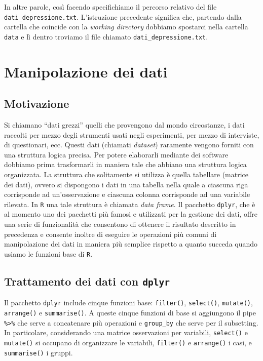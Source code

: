 \documentclass[
]{memoir}
\theoremstyle{definition}
\theoremstyle{definition}
\theoremstyle{definition}
\theoremstyle{definition}
\theoremstyle{remark}
\begin{document}
In altre parole, così facendo specifichiamo il percorso relativo del file \texttt{dati\_depressione.txt}. L'istruzione precedente significa che, partendo dalla cartella che coincide con la \emph{working directory} dobbiamo spostarci nella cartella \texttt{data} e lì dentro troviamo il file chiamato \texttt{dati\_depressione.txt}.

\hypertarget{manipolazione-dei-dati}{%
\section{Manipolazione dei dati}\label{manipolazione-dei-dati}}

\hypertarget{motivazione}{%
\subsection{Motivazione}\label{motivazione}}

Si chiamano ``dati grezzi'' quelli che provengono dal mondo circostanze, i
dati raccolti per mezzo degli strumenti usati negli esperimenti, per
mezzo di interviste, di questionari, ecc. Questi dati (chiamati
\emph{dataset}) raramente vengono forniti con una struttura logica precisa.
Per potere elaborarli mediante dei software dobbiamo prima trasformarli
in maniera tale che abbiano una struttura logica organizzata. La
struttura che solitamente si utilizza è quella tabellare (matrice dei
dati), ovvero si dispongono i dati in una tabella nella quale a ciascuna
riga corrisponde ad un'osservazione e ciascuna colonna corrisponde ad
una variabile rilevata. In \texttt{R} una tale struttura è chiamata \emph{data frame}.
Il pacchetto \texttt{dplyr}, che è al momento uno dei pacchetti più famosi e
utilizzati per la gestione dei dati, offre una serie di funzionalità che
consentono di ottenere il risultato descritto in precedenza e consente
inoltre di eseguire le operazioni più comuni di manipolazione dei dati
in maniera più semplice rispetto a quanto succeda quando usiamo le
funzioni base di \texttt{R}.

\hypertarget{trattamento-dei-dati-con-dplyr}{%
\subsection{\texorpdfstring{Trattamento dei dati con \texttt{dplyr}}{Trattamento dei dati con dplyr}}\label{trattamento-dei-dati-con-dplyr}}

Il pacchetto \texttt{dplyr} include cinque funzioni base: \texttt{filter()},
\texttt{select()}, \texttt{mutate()}, \texttt{arrange()} e \texttt{summarise()}. A queste cinque
funzioni di base si aggiungono il pipe \texttt{\%\textgreater{}\%} che serve a concatenare più
operazioni e \texttt{group\_by} che serve per il subsetting. In particolare,
considerando una matrice osservazioni per variabili, \texttt{select()} e
\texttt{mutate()} si occupano di organizzare le variabili, \texttt{filter()} e
\texttt{arrange()} i casi, e \texttt{summarise()} i gruppi.
\end{document}
